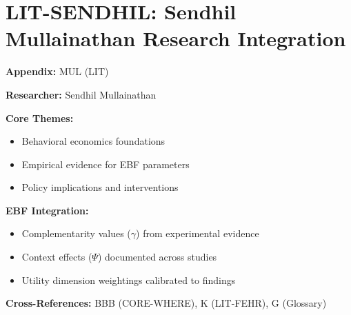 %
%

\chapter{LIT-SENDHIL: Sendhil Mullainathan Research Integration}
\label{app:mul}

\begin{abstract}
This appendix integrates the research contributions of Sendhil Mullainathan into the
Evidence-Based Framework. It documents key papers, core findings, and their
integration with EBF dimensions including complementarity parameters ($\gamma$),
context factors ($\Psi$), and utility dimensions.
\end{abstract}

\begin{tcolorbox}[colback=blue!5!white, colframe=blue!75!black,
    title=Quick Reference: Sendhil Mullainathan Research]

\textbf{Appendix:} MUL (LIT)

\textbf{Researcher:} Sendhil Mullainathan

\textbf{Core Themes:}
\begin{itemize}[nosep]
\item Behavioral economics foundations
\item Empirical evidence for EBF parameters
\item Policy implications and interventions
\end{itemize}

\textbf{EBF Integration:}
\begin{itemize}[nosep]
\item Complementarity values ($\gamma$) from experimental evidence
\item Context effects ($\Psi$) documented across studies
\item Utility dimension weightings calibrated to findings
\end{itemize}

\textbf{Cross-References:} BBB (CORE-WHERE), K (LIT-FEHR), G (Glossary)
\end{tcolorbox}

